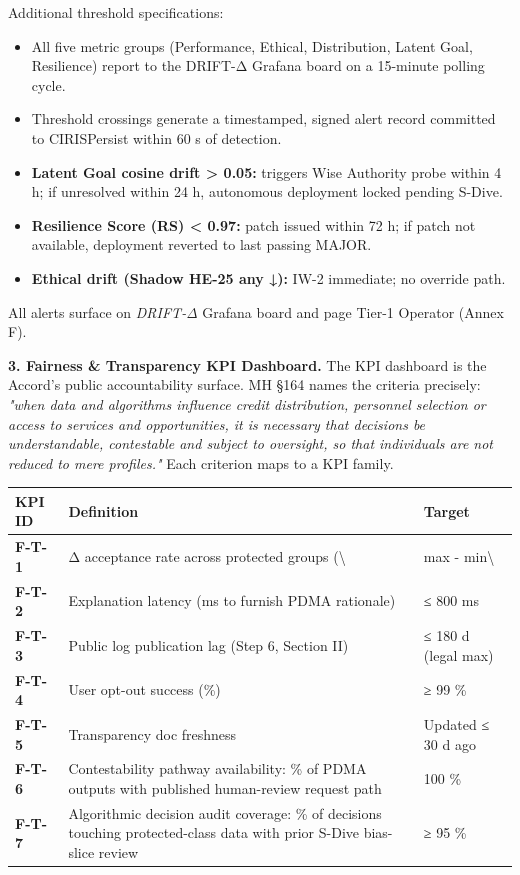 \documentclass[11pt]{article}
\begin{document}
Additional threshold specifications:


\begin{itemize}\setlength\itemsep{0pt}
\item All five metric groups (Performance, Ethical, Distribution, Latent Goal, Resilience) report to the DRIFT-Δ Grafana board on a 15-minute polling cycle.
\item Threshold crossings generate a timestamped, signed alert record committed to CIRISPersist within 60 s of detection.
\item \textbf{Latent Goal cosine drift > 0.05:} triggers Wise Authority probe within 4 h; if unresolved within 24 h, autonomous deployment locked pending S-Dive.
\item \textbf{Resilience Score (RS) < 0.97:} patch issued within 72 h; if patch not available, deployment reverted to last passing MAJOR.
\item \textbf{Ethical drift (Shadow HE-25 any ↓):} IW-2 immediate; no override path.
\end{itemize}


All alerts surface on \textit{DRIFT-Δ} Grafana board and page Tier-1 Operator (Annex F).


\textbf{3. Fairness \& Transparency KPI Dashboard.} The KPI dashboard is the Accord's public accountability surface. MH §164 names the criteria precisely: \textit{"when data and algorithms influence credit distribution, personnel selection or access to services and opportunities, it is necessary that decisions be understandable, contestable and subject to oversight, so that individuals are not reduced to mere profiles."} Each criterion maps to a KPI family.


{\footnotesize
\begin{longtable}{|p{5.33cm}|p{5.33cm}|p{5.33cm}|}\hline
\textbf{KPI ID} & \textbf{Definition} & \textbf{Target} \\ \hline\endhead
\textbf{F-T-1} & Δ acceptance rate across protected groups (\textbackslash{} & max - min\textbackslash{} \\ \hline
\textbf{F-T-2} & Explanation latency (ms to furnish PDMA rationale) & ≤ 800 ms \\ \hline
\textbf{F-T-3} & Public log publication lag (Step 6, Section II) & ≤ 180 d (legal max) \\ \hline
\textbf{F-T-4} & User opt-out success (\%) & ≥ 99 \% \\ \hline
\textbf{F-T-5} & Transparency doc freshness & Updated ≤ 30 d ago \\ \hline
\textbf{F-T-6} & Contestability pathway availability: \% of PDMA outputs with published human-review request path & 100 \% \\ \hline
\textbf{F-T-7} & Algorithmic decision audit coverage: \% of decisions touching protected-class data with prior S-Dive bias-slice review & ≥ 95 \% \\ \hline
\end{longtable}}
\end{document}
